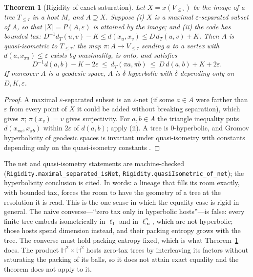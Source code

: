 \documentclass[11pt,reqno]{amsart}
\theoremstyle{plain}
\newtheorem{theorem}{Theorem}[section]
\theoremstyle{definition}
\newcommand{\Htwo}{\mathbb{H}^2}
\newcommand{\eps}{\varepsilon}
\begin{document}
\begin{theorem}[Rigidity of exact saturation]\label{thm:rigid}
Let $X=x(V_{\le\tau})$ be the image of a tree $T_{\le\tau}$ in a host $M$, and $A\supseteq X$. Suppose (i) $X$ is a maximal $\eps$-separated subset of $A$, so that $|X|=P(A,\eps)$ is attained by the image; and (ii) the code has bounded tax: $D^{-1}d_T(u,v)-K\le d(x_u,x_v)\le D\,d_T(u,v)+K$. Then $A$ is quasi-isometric to $T_{\le\tau}$: the map $\pi:A\to V_{\le\tau}$ sending $a$ to a vertex with $d(a,x_{\pi a})\le\eps$ exists by maximality, is onto, and satisfies
\[
D^{-1}d(a,b)-K-2\eps\ \le\ d_T(\pi a,\pi b)\ \le\ D\,d(a,b)+K+2\eps .
\]
If moreover $A$ is a geodesic space, $A$ is $\delta$-hyperbolic with $\delta$ depending only on $D,K,\eps$.
\end{theorem}

\begin{proof}
A maximal $\eps$-separated subset is an $\eps$-net (if some $a\in A$ were farther than $\eps$ from every point of $X$ it could be added without breaking separation), which gives $\pi$; $\pi(x_v)=v$ gives surjectivity. For $a,b\in A$ the triangle inequality puts $d(x_{\pi a},x_{\pi b})$ within $2\eps$ of $d(a,b)$; apply (ii). A tree is $0$-hyperbolic, and Gromov hyperbolicity of geodesic spaces is invariant under quasi-isometry with constants depending only on the quasi-isometry constants \cite{gromov1987}.
\end{proof}

The net and quasi-isometry statements are machine-checked (\texttt{Rigidity.maximal\_\allowbreak{}separated\_\allowbreak{}isNet}, \texttt{Rigidity.quasiIsometric\_\allowbreak{}of\_\allowbreak{}net}); the hyperbolicity conclusion is cited. In words: a lineage that fills its room exactly, with bounded tax, forces the room to have the geometry of a tree at the resolution it is read. This is the one sense in which the equality case is rigid in general. The naive converse---``zero tax only in hyperbolic hosts''---is false: every finite tree embeds isometrically in $\ell_1$ and in $\ell_\infty^n$, which are not hyperbolic; those hosts spend dimension instead, and their packing entropy grows with the tree. The converse must hold packing entropy fixed, which is what Theorem~\ref{thm:rigid} does. The product $\Htwo\times\Htwo$ hosts zero-tax trees by interleaving its factors without saturating the packing of its balls, so it does not attain exact equality and the theorem does not apply to it.
\end{document}
